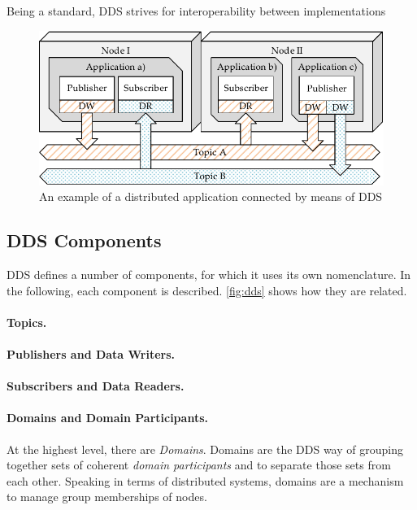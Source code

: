 Being a standard, DDS strives for interoperability between implementations


\begin{figure}[htpb]
  \centering
  \includegraphics[width=\textwidth]{figures/dds.pdf}
  \caption[DDS example]{An example of a distributed application connected by means of DDS}\label{fig:dds}
\end{figure}

\subsection{DDS Components}

DDS defines a number of components, for which it uses its own nomenclature. In the following, each component is described. \autoref{fig:dds} shows how they are related.


\paragraph{Topics.}


\paragraph{Publishers and Data Writers.}


\paragraph{Subscribers and Data Readers.}

\paragraph{Domains and Domain Participants.}
At the highest level, there are \emph{Domains}. Domains are the DDS way of grouping together sets of coherent \emph{domain participants} and to separate those sets from each other. Speaking in terms of distributed systems, domains are a mechanism to manage group memberships of nodes. \cite{tanenbaum2017distributed}

